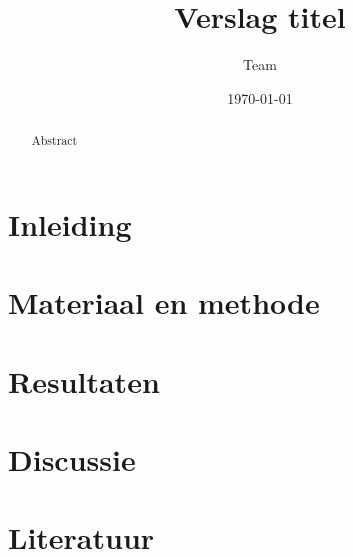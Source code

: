 \documentclass[a4paper]{article}
\title{Verslag titel}
\author{Team}
\date{\today}
\begin{document}
\maketitle

\begin{abstract}
Abstract
\end{abstract}

\section{Inleiding}

\section{Materiaal en methode}

\section{Resultaten}

\section{Discussie}

\section{Literatuur}
\end{document}
